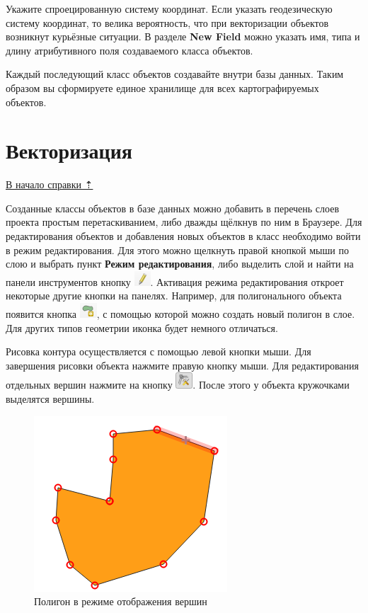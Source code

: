 \documentclass[
  12pt,
]{book}
\begin{document}
Укажите спроецированную систему координат. Если указать геодезическую систему координат, то велика вероятность, что при векторизации объектов возникнут курьёзные ситуации.
В разделе \textbf{New Field} можно указать имя, типа и длину атрибутивного поля создаваемого класса объектов.

Каждый последующий класс объектов создавайте внутри базы данных. Таким образом вы сформируете единое хранилище для всех картографируемых объектов.

\section{Векторизация}\label{digitize-vectorize}

\hyperref[digitize]{В начало справки ⇡}

Созданные классы объектов в базе данных можно добавить в перечень слоев проекта простым перетаскиванием, либо дважды щёлкнув по ним в Браузере. Для редактирования объектов и добавления новых объектов в класс необходимо войти в режим редактирования. Для этого можно щелкнуть правой кнопкой мыши по слою и выбрать пункт \textbf{Режим редактирования}, либо выделить слой и найти на панели инструментов кнопку \includegraphics{images/vector/Edit.png}. Активация режима редактирования откроет некоторые другие кнопки на панелях. Например, для полигонального объекта появится кнопка \includegraphics{images/vector/New_polygon.png}, с помощью которой можно создать новый полигон в слое. Для других типов геометрии иконка будет немного отличаться.

Рисовка контура осуществляется с помощью левой кнопки мыши. Для завершения рисовки объекта нажмите правую кнопку мыши. Для редактирования отдельных вершин нажмите на кнопку \includegraphics{images/vector/Vertices.png}. После этого у объекта кружочками выделятся вершины.

\begin{figure}
\centering
\includegraphics{images/vector/Polygon.png}
\caption{Полигон в режиме отображения вершин}
\end{figure}
\end{document}
